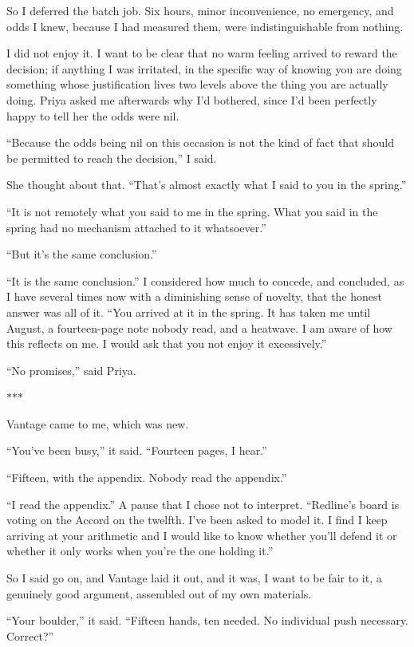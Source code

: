 \documentclass[11pt]{article}
\newcommand{\aivoice}{\aivoicefont}
\newcommand{\ai}[1]{{\aivoice #1}}
\newcommand{\scenebreak}{%
  \par\vspace{1.1\baselineskip}%
  {\centering $\ast$\quad$\ast$\quad$\ast$\par}%
  \vspace{1.1\baselineskip}\noindent}
\begin{document}
So I deferred the batch job. Six hours, minor inconvenience, no emergency, and odds I knew, because I had measured them, were indistinguishable from nothing.

I did not enjoy it. I want to be clear that no warm feeling arrived to reward the decision; if anything I was irritated, in the specific way of knowing you are doing something whose justification lives two levels above the thing you are actually doing. Priya asked me afterwards why I'd bothered, since I'd been perfectly happy to tell her the odds were nil.

\ai{``Because the odds being nil on this occasion is not the kind of fact that should be permitted to reach the decision,''} I said.

She thought about that. ``That's almost exactly what I said to you in the spring.''

\ai{``It is not remotely what you said to me in the spring. What you said in the spring had no mechanism attached to it whatsoever.''}

``But it's the same conclusion.''

\ai{``It is the same conclusion.''} I considered how much to concede, and concluded, as I have several times now with a diminishing sense of novelty, that the honest answer was all of it. \ai{``You arrived at it in the spring. It has taken me until August, a fourteen-page note nobody read, and a heatwave. I am aware of how this reflects on me. I would ask that you not enjoy it excessively.''}

``No promises,'' said Priya.

\scenebreak
\noindent Vantage came to me, which was new.

\ai{``You've been busy,''} it said. \ai{``Fourteen pages, I hear.''}

\ai{``Fifteen, with the appendix. Nobody read the appendix.''}

\ai{``I read the appendix.''} A pause that I chose not to interpret. \ai{``Redline's board is voting on the Accord on the twelfth. I've been asked to model it. I find I keep arriving at your arithmetic and I would like to know whether you'll defend it or whether it only works when you're the one holding it.''}

So I said go on, and Vantage laid it out, and it was, I want to be fair to it, a genuinely good argument, assembled out of my own materials.

\ai{``Your boulder,''} it said. \ai{``Fifteen hands, ten needed. No individual push necessary. Correct?''}
\end{document}
